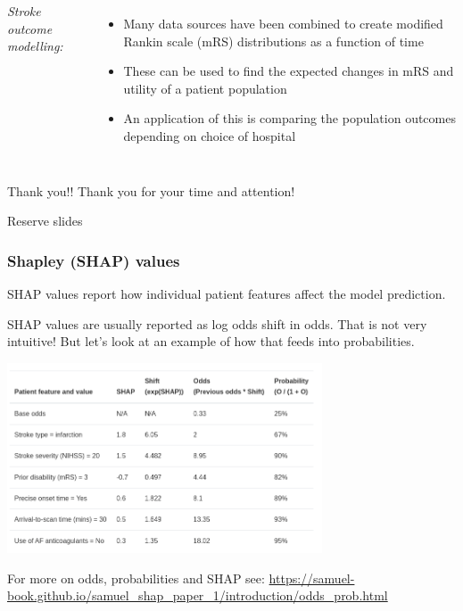 \documentclass[xcolor={usenames,dvipsnames}]{beamer}
\newcommand{\smallurl}[1]{\textcolor{blue}{\fontsize{4pt}{4.8pt}\selectfont \url{#1}}}
\begin{document}
\begin{frame}
\begin{columns}
    \emph{Stroke outcome modelling:}
    \begin{itemize}
        \footnotesize
        \item Many data sources have been combined to create modified Rankin scale (mRS) distributions as a function of time
        \item These can be used to find the expected changes in mRS and utility of a patient population
        \item An application of this is comparing the population outcomes depending on choice of hospital 
    \end{itemize}
\end{columns}

\end{frame}


\begin{frame}{Thank you!!}
    Thank you for your time and attention!
\end{frame}




\begin{frame}{Reserve slides}
    
\end{frame}



\begin{frame}
\frametitle{Shapley (SHAP) values}

{\footnotesize
SHAP values report how individual patient features affect the model prediction. 
\vspace{0.5em}

SHAP values are usually reported as log odds shift in odds. That is not very intuitive! 
But let’s look at an example of how that feeds into probabilities.
} 

\begin{center} 
\includegraphics[width=0.7\textwidth]{./images/SHAP_values_table}
\end{center} 

{\tiny For more on odds, probabilities and SHAP see: }
\smallurl{https://samuel-book.github.io/samuel_shap_paper_1/introduction/odds_prob.html}

\end{frame}
\end{document}
